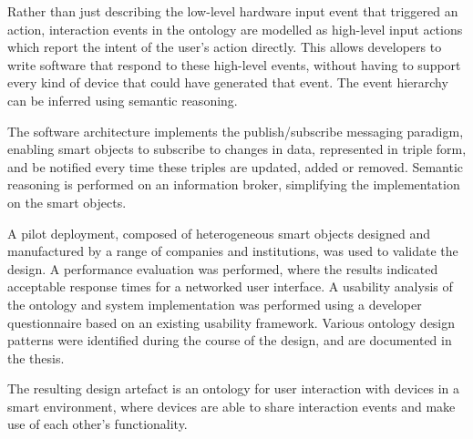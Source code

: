 Rather than just describing the low-level hardware input event that triggered an action, interaction events in the ontology are modelled as high-level input actions which report the intent of the user's action directly. This allows developers to write software that respond to these high-level events, without having to support every kind of device that could have generated that event. The event hierarchy can be inferred using semantic reasoning.

The software architecture implements the publish/subscribe messaging paradigm, enabling smart objects to subscribe to changes in data, represented in triple form, and be notified every time these triples are updated, added or removed. Semantic reasoning is performed on an information broker, simplifying the implementation on the smart objects.

A pilot deployment, composed of heterogeneous smart objects designed and manufactured by a range of companies and institutions, was used to validate the design. A performance evaluation was performed, where the results indicated acceptable response times for a networked user interface. A usability analysis of the ontology and system implementation was performed using a developer questionnaire based on an existing usability framework. Various ontology design patterns were identified during the course of the design, and are documented in the thesis.

The resulting design artefact is an ontology for user interaction with devices in a smart environment, where devices are able to share interaction events and make use of each other's functionality.


% 


\endgroup			

\vfill